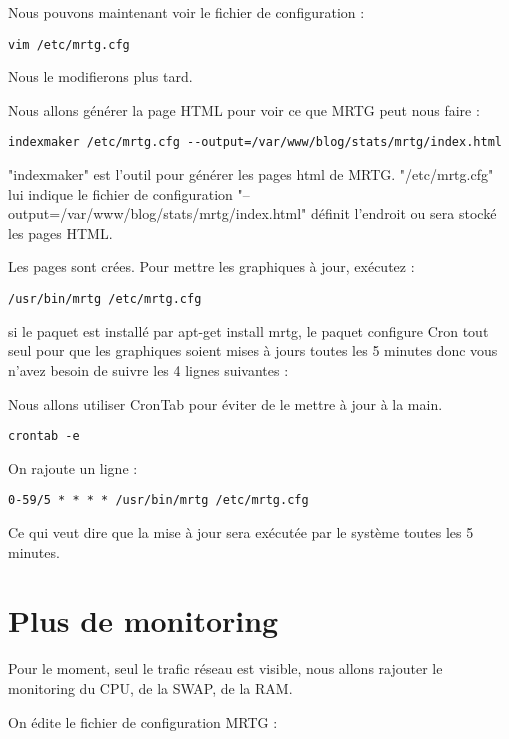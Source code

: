 Nous pouvons maintenant voir le fichier de configuration :

\begin{verbatim}
vim /etc/mrtg.cfg
\end{verbatim}


Nous le modifierons plus tard.

Nous allons générer la page HTML pour voir ce que MRTG peut nous faire :

\begin{verbatim}
indexmaker /etc/mrtg.cfg --output=/var/www/blog/stats/mrtg/index.html
\end{verbatim}


"indexmaker" est l'outil pour générer les pages html de MRTG.
"/etc/mrtg.cfg" lui indique le fichier de configuration
"--output=/var/www/blog/stats/mrtg/index.html" définit l'endroit ou sera stocké les pages HTML.

Les pages sont crées. Pour mettre les graphiques à jour, exécutez :

\begin{verbatim}
/usr/bin/mrtg /etc/mrtg.cfg
\end{verbatim}


si le paquet est installé par apt-get install mrtg, le paquet configure Cron tout seul pour que les graphiques soient mises à jours toutes les 5 minutes donc vous n'avez besoin de suivre les 4 lignes suivantes :

Nous allons utiliser CronTab pour éviter de le mettre à jour à la main.

\begin{verbatim}
crontab -e
\end{verbatim}


On rajoute un ligne : 

\begin{verbatim}
0-59/5 * * * * /usr/bin/mrtg /etc/mrtg.cfg
\end{verbatim}


Ce qui veut dire que la mise à jour sera exécutée par le système toutes les 5 minutes.


\section {Plus de monitoring}

Pour le moment, seul le trafic réseau est visible, nous allons rajouter le monitoring du CPU, de la SWAP, de la RAM.

On édite le fichier de configuration MRTG :

